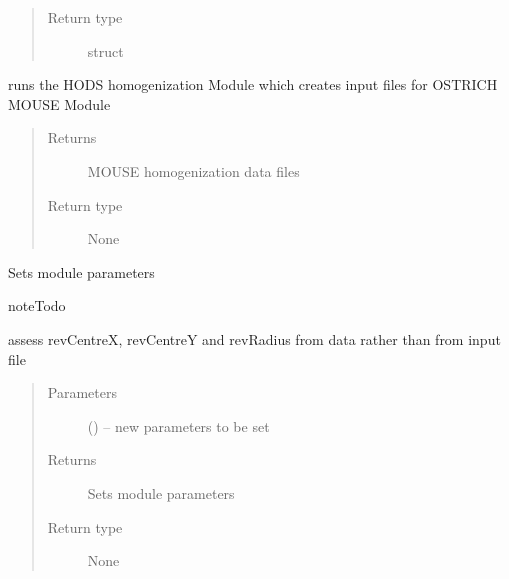 \documentclass[letterpaper,10pt,english]{sphinxmanual}
\begin{document}
\begin{fulllineitems}
\begin{fulllineitems}
\begin{quote}
\begin{description}
\item[{Return type}] \leavevmode
struct

\end{description}\end{quote}

\end{fulllineitems}


\begin{fulllineitems}
\label{\detokenize{MouseReferenceManual:Modules.Module_HODS.Module_HODS.run}}
runs the HODS homogenization Module which creates input files for OSTRICH MOUSE Module
\begin{quote}\begin{description}
\item[{Returns}] \leavevmode
MOUSE homogenization data files

\item[{Return type}] \leavevmode
None

\end{description}\end{quote}

\end{fulllineitems}


\begin{fulllineitems}
\label{\detokenize{MouseReferenceManual:Modules.Module_HODS.Module_HODS.setParameters}}
Sets module parameters

\begin{sphinxadmonition}{note}{Todo}

assess revCentreX, revCentreY and revRadius from data rather than from input file
\end{sphinxadmonition}
\begin{quote}\begin{description}
\item[{Parameters}] \leavevmode
{} () -- new parameters to be set

\item[{Returns}] \leavevmode
Sets module parameters

\item[{Return type}] \leavevmode
None

\end{description}\end{quote}

\end{fulllineitems}


\end{fulllineitems}
\end{document}
